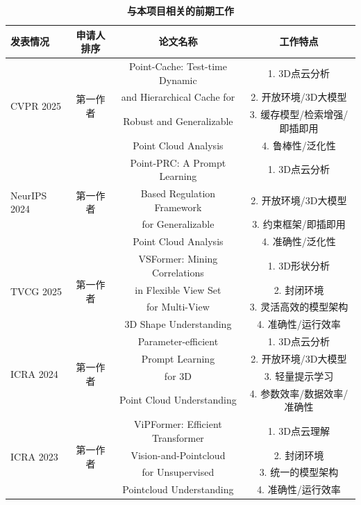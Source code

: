 \documentclass[12pt]{article}
\begin{document}
\begin{table}[ht]
   \footnotesize
   \centering
   \caption{\textbf{与本项目相关的前期工作}}
   \begin{tabular}{l c c c}
      \toprule
      发表情况 & 申请人排序 & 论文名称 & 工作特点\\
      \midrule
      \multirow{4}{*}{CVPR 2025} & \multirow{4}{*}{第一作者} & Point-Cache: Test-time Dynamic & 1. 3D点云分析 \\
      & & and Hierarchical Cache for  & 2. 开放环境/3D大模型 \\
      & & Robust and Generalizable & 3. 缓存模型/检索增强/即插即用 \\
      & & Point Cloud Analysis & 4. 鲁棒性/泛化性 \\
      \midrule
      \multirow{4}{*}{NeurIPS 2024} & \multirow{4}{*}{第一作者} & Point-PRC: A Prompt Learning   & 1. 3D点云分析 \\
      & & Based Regulation Framework   & 2. 开放环境/3D大模型 \\      
      & & for Generalizable & 3. 约束框架/即插即用 \\
      & & Point Cloud Analysis & 4. 准确性/泛化性 \\
      \midrule
      \multirow{4}{*}{TVCG 2025} & \multirow{4}{*}{第一作者} & VSFormer: Mining Correlations & 1. 3D形状分析 \\
      & & in Flexible View Set & 2. 封闭环境 \\
      & & for Multi-View & 3. 灵活高效的模型架构 \\
      & & 3D Shape Understanding & 4. 准确性/运行效率 \\
      \midrule
      \multirow{4}{*}{ICRA 2024} & \multirow{4}{*}{第一作者} & Parameter-efficient    & 1. 3D点云分析 \\
      & & Prompt Learning  & 2. 开放环境/3D大模型 \\
      & & for 3D & 3. 轻量提示学习 \\
      & & Point Cloud Understanding & 4. 参数效率/数据效率/准确性 \\
      \midrule
      \multirow{4}{*}{ICRA 2023} & \multirow{4}{*}{第一作者} & ViPFormer: Efficient  Transformer & 1. 3D点云理解 \\
      & & Vision-and-Pointcloud  & 2. 封闭环境 \\
      & & for Unsupervised & 3. 统一的模型架构 \\ %
      & & Pointcloud Understanding & 4. 准确性/运行效率 \\
      \bottomrule
   \end{tabular}
   \label{tab:research_foundation}
\end{table}
\end{document}
